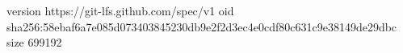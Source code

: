 version https://git-lfs.github.com/spec/v1
oid sha256:58ebaf6a7e085d073403845230db9e2f2d3ec4e0cdf80c631c9e38149de29dbc
size 699192

